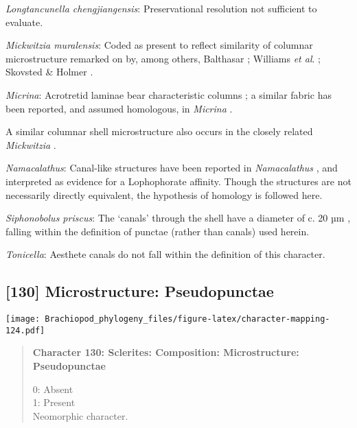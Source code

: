 \documentclass[openany]{book}
\theoremstyle{definition}
\theoremstyle{definition}
\theoremstyle{definition}
\theoremstyle{remark}
\begin{document}
\hypertarget{Longtancunella_chengjiangensis-coding-129}{}
\emph{Longtancunella chengjiangensis}: Preservational resolution not
sufficient to evaluate.

\hypertarget{Mickwitzia_muralensis-coding-129}{}
\emph{Mickwitzia muralensis}: Coded as present to reflect similarity of
columnar microstructure remarked on by, among others, Balthasar
\citeyearpar{Balthasar2008iMummpikia}; Williams \emph{et al}.
\citeyearpar{Williams2007Supplement}; Skovsted \& Holmer
\citeyearpar{Skovsted2003EarlyCambrian}.

\hypertarget{Micrina-coding-129}{}
\emph{Micrina}: Acrotretid laminae bear characteristic columns
\citep[e.g.][]{Zhang2016Epithelialcell}; a similar fabric has been
reported, and assumed homologous, in \emph{Micrina}
\citep{Butler2012ConstructingCambrian}.

A similar columnar shell microstructure also occurs in the closely
related \emph{Mickwitzia} \citep{Balthasar2008iMummpikia}.

\hypertarget{Namacalathus-coding-129}{}
\emph{Namacalathus}: Canal-like structures have been reported in
\emph{Namacalathus} \citep{Zhuravlev2015Ediacaranskeletal}, and
interpreted as evidence for a Lophophorate affinity. Though the
structures are not necessarily directly equivalent, the hypothesis of
homology is followed here.

\hypertarget{Siphonobolus_priscus-coding-129}{}
\emph{Siphonobolus priscus}: The `canals' through the shell have a
diameter of c. 20 µm \citep[text-fig. 2a]{Williams2004Chemicostructure},
falling within the definition of punctae (rather than canals) used
herein.

\hypertarget{Tonicella-coding-129}{}
\emph{Tonicella}: Aesthete canals do not fall within the definition of
this character.

\subsection*{{[}130{]} Microstructure:
Pseudopunctae}\label{microstructure-pseudopunctae}

\texttt{[image: Brachiopod\_phylogeny\_files/figure-latex/character-mapping-124.pdf]}

\begin{quote}
\textbf{Character 130: Sclerites: Composition: Microstructure:
Pseudopunctae}

0: Absent\\
1: Present\\
Neomorphic character.
\end{quote}
\end{document}
